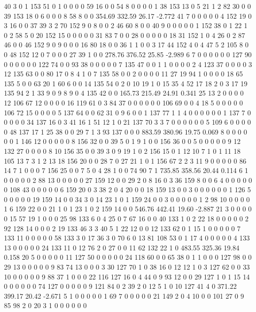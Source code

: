  40 3 0 1 153 51 0 1 0 0 0 0 59 16 0 0 54 8 0 0
 0 0 1 38 153 13 0 5 21 1 2 82 30 0 0 39 153 18 0 6
 0 0 0 8 58 8 0 0
354.69 332.59 26.17 -2.772
 41 7 0 0 0 0 0 4 152 19 0 3 16 0 0 37 39 3 2 70
 152 9 0 8 0 0 2 46 60 8 0 0 40 9 0 0 0 0 0 1
 152 38 0 1 22 1 0 2 58 5 0 20 152 15 0 0 0 0 0 31
 83 7 0 0 28 0 0 0 0 0 18 31 152 1 0 4 26 0 2 87
 46 0 0 46 152 9 0 9 0 0 0 16 80 18 0 0 36 1 1 0
 0 3 17 44 152 4 0 4 47 5 2 105 8 0 0 48 152 12 0 7
 0 0 0 27 39 1 0 0
278.76 376.52 25.85 -2.989
 6 7 0 0 0 0 0 0 127 90 0 0 0 0 0 0 122 74 0 0
 93 38 0 0 0 0 0 7 135 47 0 0 1 1 0 0 0 0 2 4
 123 37 0 0 0 0 3 12 135 63 0 0 80 17 0 8 4 1 0 7
 135 58 0 0 2 0 0 0 0 11 27 19 94 1 0 0 0 0 18 65
 135 5 0 0 63 20 1 60 6 0 0 14 135 54 0 2 0 10 19 1
 0 15 35 4 52 17 18 2 0 3 17 19 135 94 2 1 33 9 0 9
 8 9 0 4 135 42 0 0
165.73 215.49 24.91 0.341
 25 13 2 0 0 0 0 12 106 67 12 0 0 0 0 16 119 61 0 3
 84 37 0 0 0 0 0 0 106 69 0 0 4 18 5 0 0 0 0 0
 106 72 15 0 0 0 0 5 137 64 0 0 62 31 0 9 6 0 0 1
 137 77 1 1 4 0 0 0 0 0 0 1 137 7 0 0 0 0 0 34
 137 16 0 3 41 16 1 51 12 1 0 21 137 70 3 3 7 0 0 0
 0 0 0 5 109 6 0 0 0 0 0 48 137 17 1 25 38 0 0 29
 7 1 3 93 137 0 0 0
883.59 380.96 19.75 0.069
 8 0 0 0 0 0 0 1 146 12 0 0 0 0 0 8 156 32 0 0
 39 5 0 1 9 1 0 0 156 36 0 0 5 0 0 0 0 0 9 12
 132 27 0 0 0 0 8 10 156 35 0 0 39 3 0 9 19 1 0 2
 156 15 0 1 12 10 7 1 0 1 11 18 105 13 7 3 1 2 13 18
 156 20 0 0 28 7 0 27 21 1 0 1 156 67 2 2 3 11 9 0
 0 0 0 0 86 14 7 1 0 0 0 7 156 25 0 0 7 5 0 4
 28 1 0 0 74 90 7 1
735.85 358.56 20.44 0.114
 6 1 0 0 0 0 0 2 88 13 0 0 0 0 0 27 159 12 0 0
 29 2 0 8 16 0 3 36 159 8 0 0 6 4 0 0 0 0 0 0
 108 43 0 0 0 0 0 6 159 20 0 3 38 2 0 4 20 0 0 18
 159 13 0 0 3 0 0 0 0 0 0 1 126 5 0 0 0 0 0 19
 159 14 0 0 34 3 0 14 23 1 0 1 159 24 0 0 3 0 0 0
 0 0 1 2 98 10 0 0 0 0 1 6 159 22 0 0 21 1 0 1
 23 1 0 2 159 14 0 0
546.76 442.41 19.60 -2.887
 21 3 0 0 0 0 0 15 57 19 1 0 0 0 25 98 133 6 0 4
 25 0 7 67 16 0 0 40 133 1 0 2 22 18 0 0 0 0 0 2
 92 128 14 0 0 0 2 19 133 46 3 3 40 5 1 22 12 0 0 12
 133 62 0 1 15 1 0 0 0 0 0 7 133 11 0 0 0 0 0 58
 133 3 0 17 36 3 0 70 6 0 13 81 108 53 0 1 17 4 0 0
 0 0 0 4 133 13 0 0 0 0 0 24 133 11 0 12 76 2 0 27
 0 0 11 62 132 22 1 0
483.55 325.36 19.84 0.158
 20 5 0 0 0 0 0 11 127 50 0 0 0 0 0 24 118 60 0 0
 65 38 0 1 1 0 0 0 127 98 0 0 29 13 0 0 0 0 0 9
 83 74 13 0 0 0 3 30 127 70 1 0 38 16 0 12 12 1 0 3
 127 62 0 0 33 10 0 0 0 0 0 9 88 37 1 0 0 0 22 116
 127 16 0 4 44 0 9 93 12 0 0 29 127 1 0 1 15 14 0 0
 0 0 0 0 74 127 0 0 0 0 0 9 121 84 0 2 39 2 0 12
 5 1 0 10 127 41 4 0
371.22 399.17 20.42 -2.671
 5 1 0 0 0 0 0 1 69 7 0 0 0 0 0 21 149 2 0 4
 10 0 0 101 27 0 9 85 98 2 0 20 3 1 0 0 0 0 0 0
